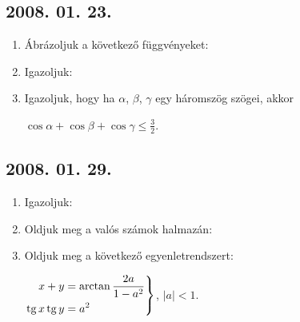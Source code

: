 \subsection*{2008. 01. 23.}
\begin{enumerate}
\item Ábrázoljuk a következő függvényeket:
\item Igazoljuk:
\item Igazoljuk, hogy ha $\alpha$, $\beta$, $\gamma$ egy háromszög szögei, akkor

$\displaystyle{\cos\alpha+\cos\beta+\cos\gamma\le\frac{3}{2}}$.
\end{enumerate}

\subsection*{2008. 01. 29.}
\begin{enumerate}
\item Igazoljuk:
\item Oldjuk meg a valós számok halmazán:
\item Oldjuk meg a következő egyenletrendszert:

$\left.
\begin{aligned}
x+y&=\arctan\dfrac{2a}{1-a^2}\\
\mathop{\mathrm{tg}}\nolimits x \mathop{\mathrm{tg}}\nolimits y&=a^2
\end{aligned}
\right\}$, $\displaystyle{|a|<1}$.
\end{enumerate}

